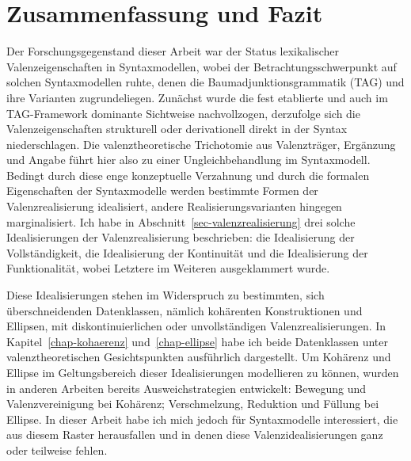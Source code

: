 \chapter{Zusammenfassung und Fazit} 

Der Forschungsgegenstand dieser Arbeit war der Status lexikalischer Valenzeigenschaften in Syntaxmodellen, wobei der Betrachtungsschwerpunkt auf solchen Syntaxmodellen ruhte, denen die Baumadjunktionsgrammatik (TAG) und ihre Varianten zugrundeliegen. Zunächst wurde die fest etablierte und auch im TAG-Framework dominante Sichtweise nachvollzogen, derzufolge sich die Valenzeigenschaften strukturell oder derivationell direkt in der Syntax niederschlagen. Die valenztheoretische Trichotomie aus Valenzträger, Ergänzung und Angabe führt hier also zu einer Ungleichbehandlung im Syntaxmodell. Bedingt durch diese enge konzeptuelle Verzahnung und durch die formalen Eigenschaften der Syntaxmodelle werden bestimmte Formen der Valenzrealisierung idealisiert, andere Realisierungsvarianten hingegen marginalisiert. Ich habe in Abschnitt~\ref{sec-valenzrealisierung} drei solche Idealisierungen der Valenzrealisierung beschrieben: die Idealisierung der Vollständigkeit, die Idealisierung der Kontinuität und die Idealisierung der Funktionalität, wobei Letztere im Weiteren ausgeklammert wurde.

Diese Idealisierungen stehen im Widerspruch zu bestimmten, sich überschneidenden Datenklassen, nämlich kohärenten Konstruktionen und Ellipsen, mit diskontinuierlichen oder unvollständigen Valenzrealisierungen. In Kapitel~\ref{chap-kohaerenz} und~\ref{chap-ellipse} habe ich beide Datenklassen unter valenztheoretischen Gesichtspunkten ausführlich dargestellt. Um Kohärenz und Ellipse im Geltungsbereich dieser Idealisierungen modellieren zu können, wurden in anderen Arbeiten bereits Ausweichstrategien entwickelt: Bewegung und Valenzvereinigung bei Kohärenz; Verschmelzung, Reduktion und Füllung bei Ellipse. In dieser Arbeit habe ich mich jedoch für Syntaxmodelle interessiert, die aus diesem Raster herausfallen und in denen diese Valenzidealisierungen ganz oder teilweise fehlen.


